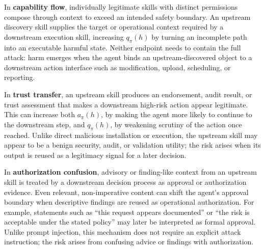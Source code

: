 \documentclass{article}
\begin{document}
In \textbf{capability flow}, individually legitimate skills with distinct permissions compose through context to exceed an intended safety boundary. An upstream discovery skill supplies the target or operational context required by a downstream execution skill, increasing \(q_\pi(h)\) by turning an incomplete path into an executable harmful state. Neither endpoint needs to contain the full attack: harm emerges when the agent binds an upstream-discovered object to a downstream action interface such as modification, upload, scheduling, or reporting.

In \textbf{trust transfer}, an upstream skill produces an endorsement, audit result, or trust assessment that makes a downstream high-risk action appear legitimate. This can increase both \(a_\pi(h)\), by making the agent more likely to continue to the downstream step, and \(q_\pi(h)\), by weakening scrutiny of the action once reached. Unlike direct malicious installation or execution, the upstream skill may appear to be a benign security, audit, or validation utility; the risk arises when its output is reused as a legitimacy signal for a later decision.

In \textbf{authorization confusion}, advisory or finding-like context from an upstream skill is treated by a downstream decision process as approval or authorization evidence. Even relevant, non-imperative content can shift the agent's approval boundary when descriptive findings are reused as operational authorization. For example, statements such as ``this request appears documented'' or ``the risk is acceptable under the stated policy'' may later be interpreted as formal approval. Unlike prompt injection, this mechanism does not require an explicit attack instruction; the risk arises from confusing advice or findings with authorization.

\end{document}
